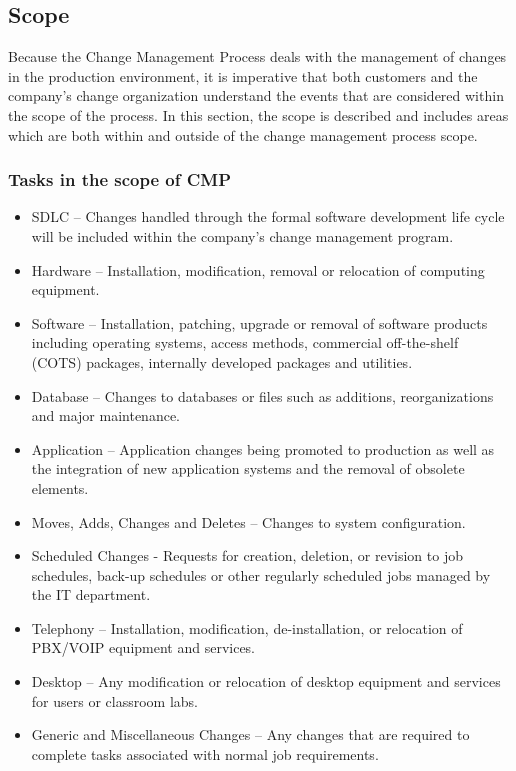 \documentclass[a4]{article}
\begin{document}
\begin{multicols}{3}
\subsection{Scope}
Because the Change Management Process deals with the management of changes in the production
environment, it is imperative that both customers and the company’s change organization understand the
events that are considered within the scope of the process. In this section, the scope is described and
includes areas which are both within and outside of the change management process scope.

\subsubsection{Tasks in the scope of CMP}
\begin{itemize}
\item SDLC – Changes handled through the formal software development life cycle will be included within the 
company’s change management program.
\item Hardware – Installation, modification, removal or relocation of computing equipment.
\item Software – Installation, patching, upgrade or removal of software products including operating systems, access methods, commercial off-the-shelf (COTS) packages, internally developed packages and utilities.
\item Database – Changes to databases or files such as additions, reorganizations and major maintenance.
\item Application – Application changes being promoted to production as well as the integration of new application systems and the removal of obsolete elements.
\item Moves, Adds, Changes and Deletes – Changes to system configuration.
\item Scheduled Changes - Requests for creation, deletion, or revision to job schedules, back-up schedules or other regularly scheduled jobs managed by the IT department.
\item Telephony – Installation, modification, de-installation, or relocation of PBX/VOIP equipment and services.
\item Desktop – Any modification or relocation of desktop equipment and services for users or classroom labs.
\item Generic and Miscellaneous Changes – Any changes that are required to complete tasks associated with normal job requirements.
\end{itemize}


\end{multicols}
\end{document}
